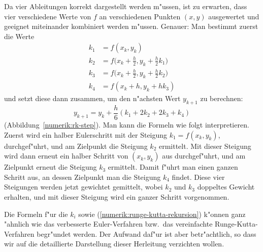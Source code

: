Da vier Ableitungen korrekt dargestellt werden m"ussen, ist zu erwarten,
dass vier verschiedene Werte von $f$ an verschiedenen Punkten $(x,y)$
ausgewertet und geeignet miteinander kombiniert werden m"ussen.
Genauer: Man bestimmt zuerst die Werte
\begin{align*}
k_1&=f(x_k,y_k)\\
k_2&=f\biggl(x_k+\frac{h}2,y_k+\frac{h}2k_1\biggr)\\
k_3&=f\biggl(x_k+\frac{h}2,y_k+\frac{h}2k_2\biggr)\\
k_4&=f(x_k+h, y_k+hk_3)
\end{align*}
und setzt diese dann zusammen, um den n"achsten Wert $y_{k+1}$
zu berechnen:
\begin{equation}
y_{k+1} = y_k + \frac{h}6(k_1 + 2k_2 + 2k_3 + k_4)
\label{numerik:runge-kutta-rekursion}
\end{equation}
(Abbildung~\ref{numerik:rk-step}).
Man kann die Formeln wie folgt interpretieren.
Zuerst wird ein halber Eulerschritt mit der Steigung $k_1=f(x_k,y_k)$,
durchgef"uhrt, und am Zielpunkt die Steigung $k_2$ ermittelt.
Mit dieser Steigung wird dann erneut ein halber Schritt von $(x_k,y_k)$
aus durchgef"uhrt, und am Zielpunkt erneut die Steigung $k_3$ ermittelt.
Damit f"uhrt man einen ganzen Schritt aus, an dessen Zielpunkt man die
Steigung $k_4$ findet.
Diese vier Steigungen werden jetzt gewichtet gemittelt, wobei
$k_2$ und $k_3$ doppeltes Gewicht erhalten, und mit dieser
Steigung wird ein ganzer Schritt vorgenommen.

Die Formeln f"ur die $k_i$ sowie (\ref{numerik:runge-kutta-rekursion})
k"onnen ganz "ahnlich wie das verbesserte Euler-Verfahren bzw.~das
vereinfachte Runge-Kutta-Verfahren begr"undet werden.
Der Aufwand daf"ur ist aber betr"achtlich, so dass wir auf die
detaillierte Darstellung dieser Herleitung verzichten wollen.

